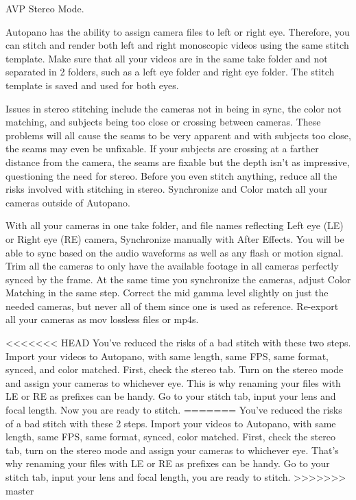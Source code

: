 \begin{fullwidth}
{\large AVP Stereo Mode. \par}

Autopano has the ability to assign camera files to left or right eye. Therefore, you can stitch and render both left and right monoscopic videos using the same stitch template. Make sure that all your videos are in the same take folder and not separated in 2 folders, such as a left eye folder and right eye folder. The stitch template is saved and used for both eyes. 


Issues in stereo stitching include the cameras not in being in sync, the color not matching, and subjects being too close or crossing between cameras. These problems will all cause the seams to be very apparent and with subjects too close, the seams may even be unfixable. If your subjects are crossing at a farther distance from the camera, the seams are fixable but the depth isn’t as impressive, questioning the need for stereo. Before you even stitch anything, reduce all the risks involved with stitching in stereo. Synchronize and Color match all your cameras outside of Autopano.


With all your cameras in one take folder, and file names reflecting Left eye (LE) or Right eye (RE) camera, Synchronize manually with After Effects. You will be able to sync based on the audio waveforms as well as any flash or motion signal. Trim all the cameras to only have the available footage in all cameras perfectly synced by the frame. At the same time you synchronize the cameras, adjust Color Matching in the same step. Correct the mid gamma level slightly on just the needed cameras, but never all of them since one is used as reference. Re-export all your cameras as mov lossless files or mp4s.


<<<<<<< HEAD
You’ve reduced the risks of a bad stitch with these two steps. Import your videos to Autopano, with same length, same FPS, same format, synced, and color matched. First, check the stereo tab. Turn on the stereo mode and assign your cameras to whichever eye. This is why renaming your files with LE or RE as prefixes can be handy. Go to your stitch tab, input your lens and focal length. Now you are ready to stitch. 
=======
You’ve reduced the risks of a bad stitch with these 2 steps. Import your videos to Autopano, with same length, same FPS, same format, synced, color matched. First, check the stereo tab, turn on the stereo mode and assign your cameras to whichever eye. That’s why renaming your files with LE or RE as prefixes can be handy. Go to your stitch tab, input your lens and focal length, you are ready to stitch. 
>>>>>>> master


\end{fullwidth}
